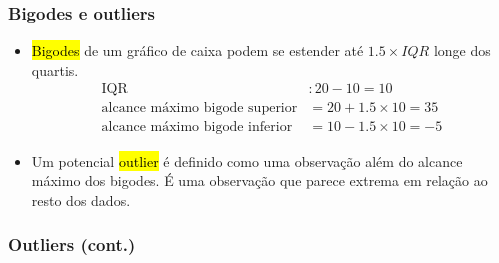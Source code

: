 
\begin{frame}[fragile]
\frametitle{Bigodes e outliers}

\begin{itemize}
\justifying
\item \hl{Bigodes} de um gráfico de caixa podem se estender até $1.5 \times IQR$ longe dos quartis.\\
\pause
\vspace{-0.5cm}
{\small
\begin{align*}
\text{IQR}&: 20 - 10 = 10 \\
\text{alcance~máximo~bigode~superior}&= 20 + 1.5 \times 10 = 35 \\
\text{alcance~máximo~bigode~inferior}&= 10 - 1.5 \times 10 = -5
\end{align*}
}

\pause
\vspace{-0.25cm}
\justifying
\item Um potencial \hl{outlier} é definido como uma observação além do alcance máximo dos bigodes. É uma observação que parece extrema em relação ao resto dos dados.

\end{itemize}

\end{frame}


\begin{frame}
\frametitle{Outliers (cont.)}
\justifying
{}


\end{frame}

